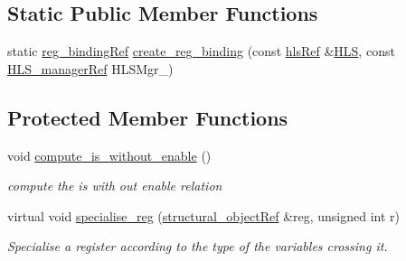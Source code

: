 \subsection*{Static Public Member Functions}
\begin{DoxyCompactItemize}
\item 
static \hyperlink{reg__binding_8hpp_aa41bd7902f9f054af782503a16789fd2}{reg\+\_\+binding\+Ref} \hyperlink{classreg__binding_a80abb6a0e0eec2dbfbb4e4a8b6b0eda7}{create\+\_\+reg\+\_\+binding} (const \hyperlink{hls_8hpp_a75d0c73923d0ddfa28c4843a802c73a7}{hls\+Ref} \&\hyperlink{classreg__binding_ab715d356b916ed5376a21628b556ef71}{H\+LS}, const \hyperlink{hls__manager_8hpp_acd3842b8589fe52c08fc0b2fcc813bfe}{H\+L\+S\+\_\+manager\+Ref} H\+L\+S\+Mgr\+\_\+)
\end{DoxyCompactItemize}
\subsection*{Protected Member Functions}
\begin{DoxyCompactItemize}
\item 
void \hyperlink{classreg__binding_ad6fd4336ceaa2e65955560fed8e0d41b}{compute\+\_\+is\+\_\+without\+\_\+enable} ()
\begin{DoxyCompactList}\small\item\em compute the is with out enable relation \end{DoxyCompactList}\item 
virtual void \hyperlink{classreg__binding_a3b84d34513f28b85ddbd578b2d0ce191}{specialise\+\_\+reg} (\hyperlink{structural__objects_8hpp_a8ea5f8cc50ab8f4c31e2751074ff60b2}{structural\+\_\+object\+Ref} \&reg, unsigned int r)
\begin{DoxyCompactList}\small\item\em Specialise a register according to the type of the variables crossing it. \end{DoxyCompactList}\end{DoxyCompactItemize}
